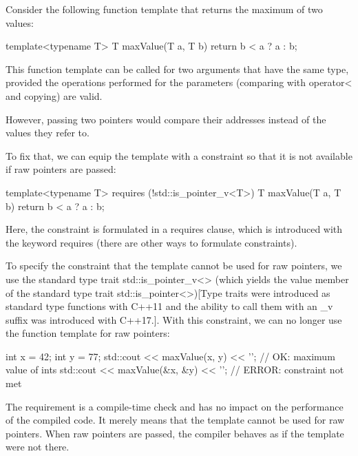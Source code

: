 

Consider the following function template that returns the maximum of two values:

\begin{cpp}
template<typename T>
T maxValue(T a, T b) {
	return b < a ? a : b;
}
\end{cpp}

This function template can be called for two arguments that have the same type, provided the operations performed for the parameters (comparing with operator< and copying) are valid.

However, passing two pointers would compare their addresses instead of the values they refer to.




To fix that, we can equip the template with a constraint so that it is not available if raw pointers are passed:

\begin{cpp}
template<typename T>
requires (!std::is_pointer_v<T>)
T maxValue(T a, T b)
{
	return b < a ? a : b;
}
\end{cpp}

Here, the constraint is formulated in a requires clause, which is introduced with the keyword requires (there are other ways to formulate constraints).

To specify the constraint that the template cannot be used for raw pointers, we use the standard type trait std::is\_pointer\_v<> (which yields the value member of the standard type trait std::is\_pointer<>)[Type traits were introduced as standard type functions with C++11 and the ability to call them with an \_v suffix was introduced with C++17.]. With this constraint, we can no longer use the function template for raw pointers:

\begin{cpp}
int x = 42;
int y = 77;
std::cout << maxValue(x, y) << '\n'; // OK: maximum value of ints
std::cout << maxValue(&x, &y) << '\n'; // ERROR: constraint not met
\end{cpp}

The requirement is a compile-time check and has no impact on the performance of the compiled code. It merely means that the template cannot be used for raw pointers. When raw pointers are passed, the compiler behaves as if the template were not there.


